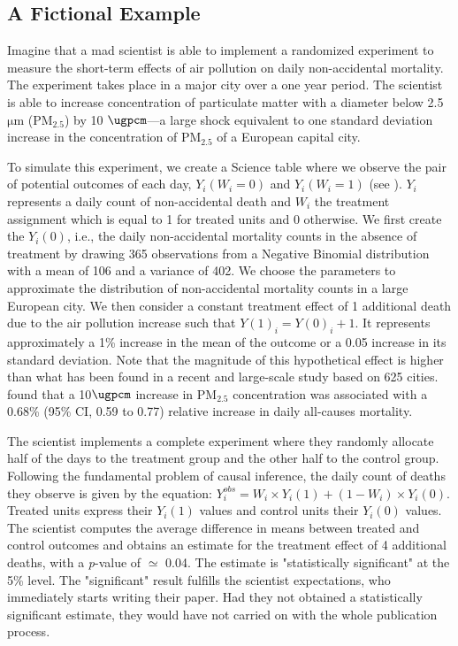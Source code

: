 \documentclass[12pt]{article}
\begin{document}
    \subsection{A Fictional Example}

    Imagine that a mad scientist is able to implement a randomized experiment to measure the short-term effects of air pollution on daily non-accidental mortality. The experiment takes place in a major city over a one year period. The scientist is able to increase concentration of particulate matter with a diameter below 2.5 $\si{\um}$ (PM$_{2.5}$) by 10 $\si{\ugpcm}$---a large shock equivalent to one standard deviation increase in the concentration of PM$_{2.5}$ of a European capital city.
    
        

    To simulate this experiment, we create a Science table where we observe the pair of potential outcomes of each day, $Y_{i}(W_{i}=0)$ and $Y_{i}(W_{i}=1)$ (see ). $Y_{i}$ represents a daily count of non-accidental death and $W_{i}$ the treatment assignment which is equal to 1 for treated units and 0 otherwise. We first create the $Y_{i}(0)$, i.e., the daily non-accidental mortality counts in the absence of treatment by drawing 365 observations from a Negative Binomial distribution with a mean of 106 and a variance of 402. We choose the parameters to approximate the distribution of non-accidental mortality counts in a large European city. We then consider a constant treatment effect of 1 additional death due to the air pollution increase such that $Y(1)_{i} = Y(0)_{i} + 1$. It represents approximately a 1\% increase in the mean of the outcome or a 0.05 increase in its standard deviation. Note that the magnitude of this hypothetical effect is higher than what has been found in a recent and large-scale study based on 625 cities. \cite{liu_ambient_2019} found that a 10$\si{\ugpcm}$ increase in $\text{PM}_{2.5}$ concentration was associated with a 0.68\% (95\% CI, 0.59 to 0.77) relative increase in daily all-causes mortality. 
    
    The scientist implements a complete experiment where they randomly allocate half of the days to the treatment group and the other half to the control group. Following the fundamental problem of causal inference, the daily count of deaths they observe is given by the equation: $Y_{i}^{obs} = W_{i} \times Y_{i}(1) + (1-W_{i})\times Y_{i}(0)$. Treated units express their $Y_{i}(1)$ values and control units their $Y_{i}(0)$ values. The scientist computes the average difference in means between treated and control outcomes and obtains an estimate for the treatment effect of 4 additional deaths, with a \textit{p}-value of $\simeq$ 0.04. The estimate is "statistically significant" at the 5\% level. The "significant" result fulfills the scientist expectations, who immediately starts writing their paper. Had they not obtained a statistically significant estimate, they would have not carried on with the whole publication process.
        
\end{document}
